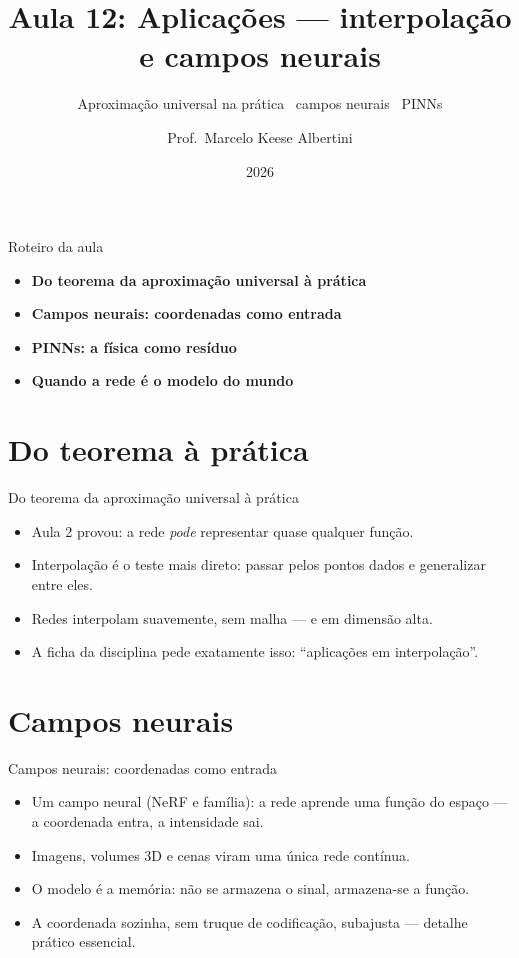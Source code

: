 \documentclass[aspectratio=169, 11pt]{beamer}
\title[Aula 12 — Interpolação]{Aula 12: Aplicações — interpolação e campos neurais}
\subtitle[GBC073 — Inteligência Computacional]{Aproximação universal na prática \textbullet\ campos neurais \textbullet\ PINNs}
\author[Prof.\ Marcelo Albertini]{Prof.\ Marcelo Keese Albertini}
\institute{GBC073 — Inteligência Computacional \textbullet\ Universidade Federal de Uberlândia}
\date{2026}
\begin{document}
\begin{frame}
  \titlepage
\end{frame}

\begin{frame}{Roteiro da aula}
  \begin{itemize}\setlength{\itemsep}{0.5ex}
    \item<1-> \textbf{Do teorema da aproximação universal à prática}
    \item<2-> \textbf{Campos neurais: coordenadas como entrada}
    \item<3-> \textbf{PINNs: a física como resíduo}
    \item<4-> \textbf{Quando a rede é o modelo do mundo}
  \end{itemize}
\end{frame}

\section{Do teorema à prática}

\begin{frame}{Do teorema da aproximação universal à prática}
  \begin{itemize}\setlength{\itemsep}{0.4ex}
    \item Aula 2 provou: a rede \emph{pode} representar quase qualquer função.
    \item Interpolação é o teste mais direto: passar pelos pontos dados e
          generalizar entre eles.
    \item Redes interpolam suavemente, sem malha — e em dimensão alta.
    \item A ficha da disciplina pede exatamente isso: ``aplicações em
          interpolação''.
  \end{itemize}
\end{frame}

\section{Campos neurais}

\begin{frame}{Campos neurais: coordenadas como entrada}
  \begin{itemize}\setlength{\itemsep}{0.4ex}
    \item Um campo neural (NeRF e família): a rede aprende uma função do
          espaço — a coordenada entra, a intensidade sai.
    \item Imagens, volumes 3D e cenas viram uma única rede contínua.
    \item O modelo é a memória: não se armazena o sinal, armazena-se a função.
    \item A coordenada sozinha, sem truque de codificação, subajusta — detalhe
          prático essencial.
  \end{itemize}
\end{frame}
\end{document}
